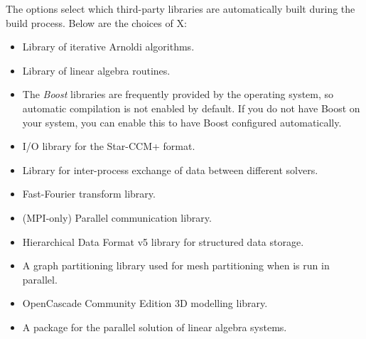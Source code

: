 The  options select which third-party libraries are
automatically built during the \nekpp build process. Below are the choices of X:
\begin{itemize}
    \item {}

    Library of iterative Arnoldi algorithms.

    \item {}

    Library of linear algebra routines.

    \item {}

    The \emph{Boost} libraries are frequently provided by the operating system,
    so automatic compilation is not enabled by default. If you do not have
    Boost on your system, you can enable this to have Boost configured
    automatically.

    \item {}

    I/O library for the Star-CCM+ format.

    \item {}

    Library for inter-process exchange of data between different solvers.

    \item {}

    Fast-Fourier transform library.

    \item {}

    (MPI-only) Parallel communication library.

    \item {}

    Hierarchical Data Format v5 library for structured data storage.

    \item {}

    A graph partitioning library used for mesh partitioning when \nekpp is run
    in parallel.

    \item {}

    OpenCascade Community Edition 3D modelling library.

    \item {}

    A package for the parallel solution of linear algebra systems.


\end{itemize}
